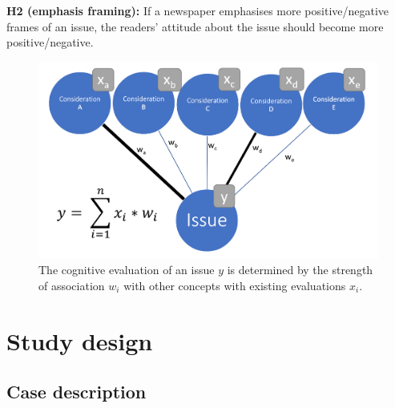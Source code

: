 \documentclass{article}
\begin{document}
\textbf{H2 (emphasis framing):} If a newspaper emphasises more positive/negative frames of an issue, the readers' attitude about the issue should become more positive/negative.


\begin{center}
\begin{figure}
    \centering
    \includegraphics[width=\textwidth]{pres/vis/CognitiveStorage.png}
    \caption{The cognitive evaluation of an issue $y$ is determined by the strength of association $w_i$ with other concepts with existing evaluations $x_i$.}
    \label{fig:cogStor}
\end{figure}
\end{center}



\section{Study design}

\subsection{Case description}
\end{document}
